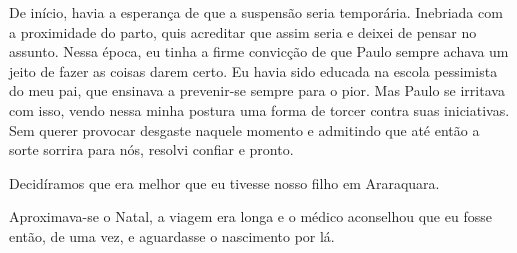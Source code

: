 De início, havia a esperança de que a suspensão seria temporária.
Inebriada com a proximidade do parto, quis acreditar que assim seria e deixei de pensar no assunto.
Nessa época, eu tinha a firme convicção de que Paulo sempre achava um jeito de fazer as coisas darem certo.
Eu havia sido educada na escola pessimista do meu pai, que ensinava a prevenir-se sempre para o pior.
Mas Paulo se irritava com isso, vendo nessa minha postura uma forma de torcer contra suas iniciativas.
Sem querer provocar desgaste naquele momento e admitindo que até então a sorte sorrira para nós, resolvi confiar e pronto.

Decidíramos que era melhor que eu tivesse nosso filho em Araraquara.

Aproximava-se o Natal, a viagem era longa e o médico aconselhou que eu fosse então, de uma vez, e aguardasse o nascimento por lá.